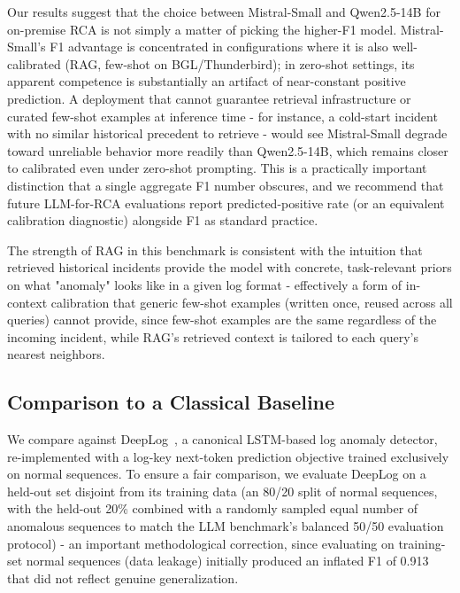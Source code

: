 \documentclass[10pt,conference]{IEEEtran}
\begin{document}
Our results suggest that the choice between Mistral-Small and Qwen2.5-14B
for on-premise RCA is not simply a matter of picking the higher-F1 model.
Mistral-Small's F1 advantage is concentrated in configurations where it is
also well-calibrated (RAG, few-shot on BGL/Thunderbird); in zero-shot
settings, its apparent competence is substantially an artifact of
near-constant positive prediction. A deployment that cannot guarantee
retrieval infrastructure or curated few-shot examples at inference time -
for instance, a cold-start incident with no similar historical precedent
to retrieve - would see Mistral-Small degrade toward unreliable behavior
more readily than Qwen2.5-14B, which remains closer to calibrated even
under zero-shot prompting. This is a practically important distinction
that a single aggregate F1 number obscures, and we recommend that future
LLM-for-RCA evaluations report predicted-positive rate (or an equivalent
calibration diagnostic) alongside F1 as standard practice.

The strength of RAG in this benchmark is consistent with the intuition
that retrieved historical incidents provide the model with concrete,
task-relevant priors on what "anomaly" looks like in a given log format -
effectively a form of in-context calibration that generic few-shot
examples (written once, reused across all queries) cannot provide, since
few-shot examples are the same regardless of the incoming incident, while
RAG's retrieved context is tailored to each query's nearest neighbors.

\subsection{Comparison to a Classical Baseline}

We compare against DeepLog~\cite{deeplog2017}, a canonical LSTM-based log
anomaly detector, re-implemented with a log-key next-token prediction
objective trained exclusively on normal sequences. To ensure a fair
comparison, we evaluate DeepLog on a held-out set disjoint from its
training data (an 80/20 split of normal sequences, with the held-out 20\%
combined with a randomly sampled equal number of anomalous sequences to
match the LLM benchmark's balanced 50/50 evaluation protocol) - an
important methodological correction, since evaluating on training-set
normal sequences (data leakage) initially produced an inflated F1 of 0.913
that did not reflect genuine generalization.
\end{document}

